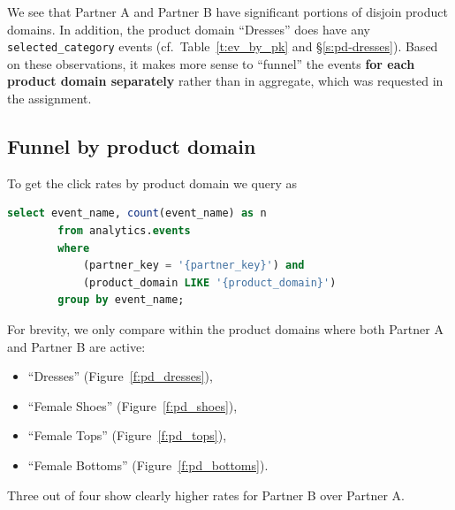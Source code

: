 \documentclass[12pt,a4paper]{article}
\begin{document}
    We see that {Partner A} and {Partner B}
    have significant portions of disjoin product domains. 
    In addition, 
    the product domain ``Dresses'' 
    does have any 
    \verb|selected_category|
    events 
    (cf.~Table~\ref{t:ev_by_pk} and \S\ref{s:pd-dresses}). 
    Based on these observations,
    it makes more sense 
    to
    ``funnel'' the events
    \textbf{for each product domain separately}
    rather than in aggregate,
    which was requested in the assignment.
    

    \clearpage
    
    \subsection{Funnel by product domain}
    
    
    To get the click rates by product domain
    we query as
    \begin{lstlisting}[language=SQL]
        select event_name, count(event_name) as n
        from analytics.events
        where 
            (partner_key = '{partner_key}') and
            (product_domain LIKE '{product_domain}')
        group by event_name;
    \end{lstlisting}
    
    
    For brevity,
    we only compare
    within the product domains 
    where both Partner A and Partner B are active:
    \begin{itemize}
    \item 
        ``Dresses'' (Figure~\ref{f:pd_dresses}),
    \item 
        ``Female Shoes'' (Figure~\ref{f:pd_shoes}),
    \item 
        ``Female Tops'' (Figure~\ref{f:pd_tops}),
    \item 
        ``Female Bottoms'' (Figure~\ref{f:pd_bottoms}).
    \end{itemize}

    Three out of four
    show clearly higher rates
    for Partner B over Partner A.
    
\end{document}

